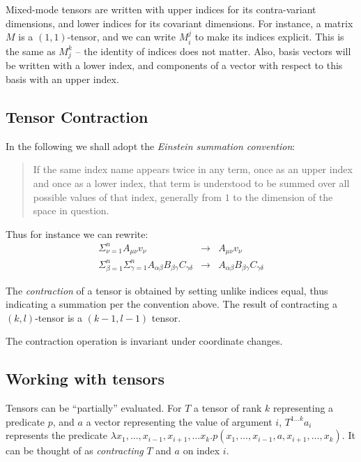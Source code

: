 Mixed-mode tensors  are written with upper indices for its contra-variant dimensions, and lower indices for its covariant dimensions. For instance, a matrix \(M\) is a \((1,1)\)-tensor, and we can write \(M_i^j\) to make its indices explicit. This is the same as \(M_j^k\) -- the identity of indices does not matter. Also, basis vectors will be written with a lower index, and components of a vector with respect to this basis with an upper index.
\subsection{Tensor Contraction}\label{sec:summation-convention}
In the following we shall adopt the {\em Einstein summation convention}:
\begin{quotation}
  If the same index name appears twice in any term, once as an upper index and once as a lower index, that term is understood to be summed over all possible values of that index, generally from \(1\) to the dimension of the space in question. 
\end{quotation}
Thus for instance we can rewrite:
\[
\begin{array}{lcl}
  \Sigma_{\nu=1}^n A_{\mu\nu}v_{\nu} & \rightarrow &   A_{\mu\nu}v_{\nu}\\
  \Sigma_{\beta=1}^n \Sigma_{\gamma=1}^n A _{\alpha \beta}B_{\beta \gamma}C_{\gamma \delta} & \rightarrow & A_{\alpha \beta}B_{\beta \gamma}C_{\gamma \delta}
\end{array}
\]

The {\em contraction} of a tensor is obtained by setting unlike indices equal, thus indicating a summation per the convention above. The result of contracting a \((k,l)\)-tensor  is a \((k-1,l-1)\) tensor.

The contraction operation is invariant under coordinate changes.


\subsection{Working with tensors}
  
Tensors can be ``partially'' evaluated. For \(T\) a tensor of rank \(k\) representing a predicate \(p\), and \(a\) a vector representing the value of argument \(i\), \(T^{1\ldots k}a_i\) represents the predicate \(\lambda x_1, \ldots, x_{i-1},x_{i+1},\ldots x_k. p(x_1, \ldots, x_{i-1}, a, x_{i+1}, \ldots, x_k)\). It can be thought of as {\em contracting} \(T\) and \(a\) on index \(i\).
  

